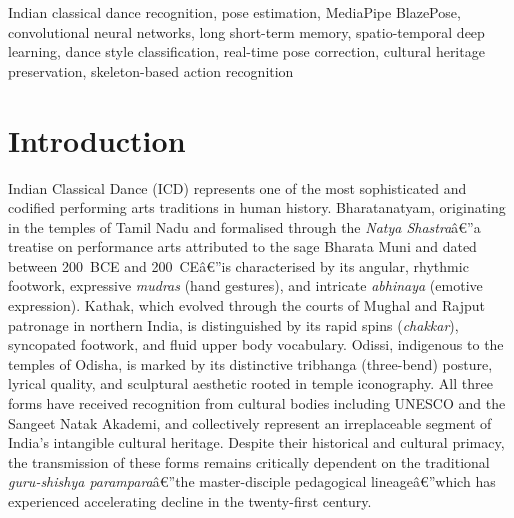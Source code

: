 \documentclass[journal]{IEEEtran}
\begin{document}
\begin{IEEEkeywords}
Indian classical dance recognition, pose estimation, MediaPipe
BlazePose, convolutional neural networks, long short-term memory,
spatio-temporal deep learning, dance style classification, real-time
pose correction, cultural heritage preservation, skeleton-based action
recognition
\end{IEEEkeywords}

\section{Introduction}
\label{sec:introduction}

Indian Classical Dance (ICD) represents one of the most sophisticated
and codified performing arts traditions in human history. Bharatanatyam,
originating in the temples of Tamil Nadu and formalised through the
\textit{Natya Shastra}â€”a treatise on performance arts attributed to
the sage Bharata Muni and dated between 200~BCE and 200~CEâ€”is
characterised by its angular, rhythmic footwork, expressive
\textit{mudras} (hand gestures), and intricate \textit{abhinaya}
(emotive expression). Kathak, which evolved through the courts of
Mughal and Rajput patronage in northern India, is distinguished by its
rapid spins (\textit{chakkar}), syncopated footwork, and fluid upper
body vocabulary. Odissi, indigenous to the temples of Odisha, is
marked by its distinctive tribhanga (three-bend) posture, lyrical
quality, and sculptural aesthetic rooted in temple iconography.
All three forms have received recognition from cultural bodies
including UNESCO and the Sangeet Natak Akademi, and collectively
represent an irreplaceable segment of India's intangible cultural
heritage. Despite their historical and cultural primacy, the
transmission of these forms remains critically dependent on the
traditional \textit{guru-shishya parampara}â€”the master-disciple
pedagogical lineageâ€”which has experienced accelerating decline in
the twenty-first century.
\end{document}
